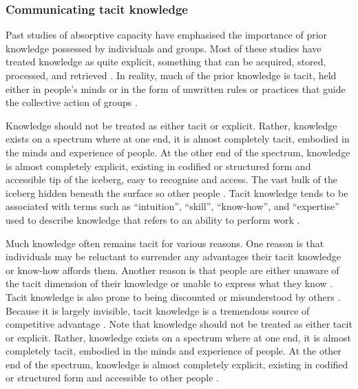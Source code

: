\subsubsection{Communicating tacit knowledge}

Past studies of absorptive capacity have emphasised the importance of prior knowledge possessed by individuals and groups. Most of these studies have treated knowledge as quite explicit, something that can be acquired, stored, processed, and retrieved \citep{omidvar2013revisiting,marabelli2014knowing}. In reality, much of the prior knowledge is tacit, held either in people's minds or in the form of unwritten rules or practices that guide the collective action of groups \citep{mowery1996strategic,leonard1998role,horvath2000working,burt2007secondhand,nonaka2009perspective,goksel2016can,lichtenthaler2016absorptive}. \medskip

Knowledge should not be treated as either tacit or explicit. Rather, knowledge exists on a spectrum where at one end, it is almost completely tacit, embodied in the minds and experience of people. At the other end of the spectrum, knowledge is almost completely explicit, existing in codified or structured form and accessible tip of the iceberg, easy to recognise and access. The vast bulk of the iceberg hidden beneath the surface so other people \citep{polanyi1966tacit,leonard1998role,nonaka2009perspective}. Tacit knowledge tends to be associated with terms such as \enquote{intuition}, \enquote{skill}, \enquote{know-how}, and \enquote{expertise} used to describe knowledge that refers to an ability to perform work \citep{mcadam2007exploring}. \medskip

Much knowledge often remains tacit for various reasons. One reason is that individuals may be reluctant to surrender any advantages their tacit knowledge or know-how affords them. Another reason is that people are either unaware of the tacit dimension of their knowledge or unable to express what they know \citep{leonard1998role,eraut2000non}. Tacit knowledge is also prone to being discounted or misunderstood by others \citep{burt2007secondhand}. Because it is largely invisible, tacit knowledge is a tremendous source of competitive advantage \citep{nelson1982evolutionary,barney1991firm,grant1996toward,smith2001role,chilton2007dimensions,lu2015job}. Note that knowledge should not be treated as either tacit or explicit. Rather, knowledge exists on a spectrum where at one end, it is almost completely tacit, embodied in the minds and experience of people. At the other end of the spectrum, knowledge is almost completely explicit, existing in codified or structured form and accessible to other people \citep{polanyi1966tacit,leonard1998role,nonaka2009perspective}. \medskip

